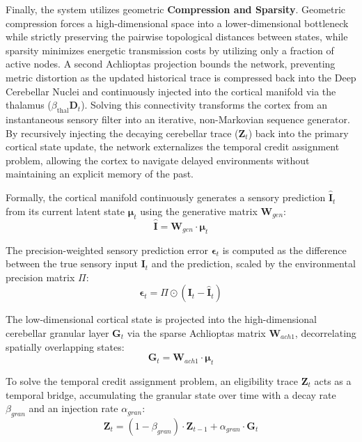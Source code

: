 \documentclass[12pt, a4paper]{extarticle}
\begin{document}
	Finally, the system utilizes geometric \textbf{Compression and Sparsity}. Geometric compression forces a high-dimensional space into a lower-dimensional bottleneck while strictly preserving the pairwise topological distances between states, while sparsity minimizes energetic transmission costs by utilizing only a fraction of active nodes. A second Achlioptas projection bounds the network, preventing metric distortion as the updated historical trace is compressed back into the Deep Cerebellar Nuclei and continuously injected into the cortical manifold via the thalamus ($\beta_{\mathrm{thal}} \mathbf{D}_t$). Solving this connectivity transforms the cortex from an instantaneous sensory filter into an iterative, non-Markovian sequence generator. By recursively injecting the decaying cerebellar trace ($\mathbf{Z}_t$) back into the primary cortical state update, the network externalizes the temporal credit assignment problem, allowing the cortex to navigate delayed environments without maintaining an explicit memory of the past.
	
	Formally, the cortical manifold continuously generates a sensory prediction $\hat{\mathbf{I}}_t$ from its current latent state $\boldsymbol{\mu}_{t}$ using the generative matrix $\mathbf{W}_{gen}$:
	\begin{equation}
		\hat{\mathbf{I}} = \mathbf{W}_{gen} \cdot \boldsymbol{\mu}_{t}\label{ctx_hallucination}
	\end{equation}
	
	The precision-weighted sensory prediction error $\boldsymbol{\epsilon}_{t}$ is computed as the difference between the true sensory input $\mathbf{I}_{t}$ and the prediction, scaled by the environmental precision matrix $\Pi$:
	\begin{equation}
		\boldsymbol{\epsilon}_{t} = \Pi \odot (\mathbf{I}_{t} - \hat{\mathbf{I}}_{t})\label{ctx_pe}
	\end{equation}
	
	The low-dimensional cortical state is projected into the high-dimensional cerebellar granular layer $\mathbf{G}_{t}$ via the sparse Achlioptas matrix $\mathbf{W}_{ach1}$, decorrelating spatially overlapping states:
	\begin{equation}
		\mathbf{G}_{t} = \mathbf{W}_{ach1} \cdot \boldsymbol{\mu}_{t}\label{gran}
	\end{equation}
	
	To solve the temporal credit assignment problem, an eligibility trace $\mathbf{Z}_{t}$ acts as a temporal bridge, accumulating the granular state over time with a decay rate $\beta_{gran}$ and an injection rate $\alpha_{gran}$:
	\begin{equation}
		\mathbf{Z}_{t} = (1 - \beta_{gran}) \cdot \mathbf{Z}_{t-1} + \alpha_{gran} \cdot \mathbf{G}_{t}\label{et}
	\end{equation}
	
\end{document}
